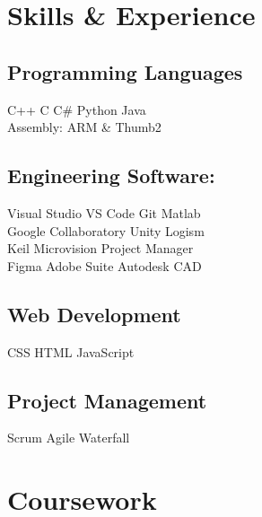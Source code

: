 \documentclass[]{deedy-resume-openfont}
\begin{document}
\begin{minipage}[t]{0.35\textwidth}

\section{Skills \& Experience}
\subsection{Programming Languages}
C++ \textbullet{}   C \textbullet{} C\# \textbullet{} Python \textbullet{} Java \\
Assembly: ARM \& Thumb2 \\
\subsection{Engineering Software: }
Visual Studio \textbullet{} VS Code \textbullet{} Git \textbullet{} Matlab \\
Google Collaboratory \textbullet{} Unity \textbullet{} Logism \\
Keil Microvision \textbullet{} Project Manager \\
Figma \textbullet{} Adobe Suite \textbullet{} Autodesk CAD\\
\subsection{Web Development}
CSS \textbullet{} HTML \textbullet{} JavaScript \\
\subsection{Project Management}
Scrum \textbullet{} Agile \textbullet{} Waterfall  \\
\sectionsep


\section{Coursework}


\end{minipage}
\end{document}
